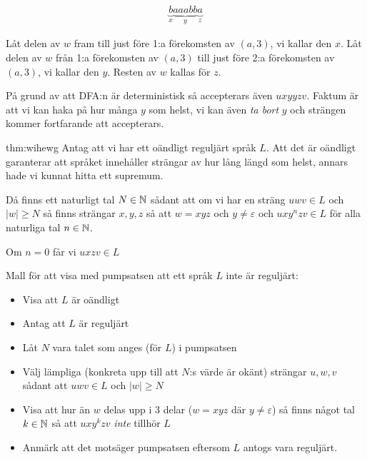 \begin{equation*}
  \begin{gathered}
  \underbrace{b}_{\text{$x$}}\underbrace{aaabb}_{\text{$y$}}\underbrace{a}_{\text{$z$}}
  \end{gathered}
\end{equation*}\par
\noindent Låt delen av $w$ fram till just före 1:a förekomsten av $(a,3)$, vi kallar den $x$. Låt delen av $w$ från 1:a förekomsten av $(a,3)$ till just före 2:a förekomsten av $(a,3)$, vi kallar den $y$. Resten av $w$ kallas för $z$.
\par\bigskip
\noindent På grund av att DFA:n är deterministisk så accepterars även $uxyyzv$. Faktum är att vi kan haka på hur många $y$ som helst, vi kan även \textit{ta bort} $y$ och strängen kommer fortfarande att accepterars.
\par\bigskip
\begin{theo}{thm:wihewg}
  Antag att vi har ett oändligt reguljärt språk $L$. Att det är oändligt garanterar att språket innehåller strängar av hur lång längd som helst, annars hade vi kunnat hitta ett supremum.
  \par\bigskip
  \noindent Då finns ett naturligt tal $N\in\mathbb{N}$ sådant att om vi har en sträng $uwv\in L$ och $\left|w\right|\geq N$ så finns strängar $x,y,z$ så att $w=xyz$ och $y\neq\varepsilon$ och $uxy^nzv\in L$ för alla naturliga tal $n\in\mathbb{N}$.\par
  \noindent Om $n=0$ får vi $uxzv\in L$
\end{theo}
\par\bigskip
\noindent Mall för att visa med pumpsatsen att ett språk $L$ inte är reguljärt:
\begin{itemize}
  \item Visa att $L$ är oändligt
  \item Antag att $L$ är reguljärt
  \item Låt $N$ vara talet som anges (för $L$) i pumpsatsen
  \item Välj lämpliga (konkreta upp till att $N$:s värde är okänt) strängar $u,w,v$ sådant att $uwv\in L$ och $\left|w\right|\geq N$
  \item Visa att hur än $w$ delas upp i 3 delar ($w=xyz$ där $y\neq\varepsilon$) så finns något tal $k\in\mathbb{N}$ så att $uxy^kzv$ \textit{inte} tillhör $L$
  \item Anmärk att det motsäger pumpsatsen eftersom $L$ antogs vara reguljärt. 
\end{itemize}
